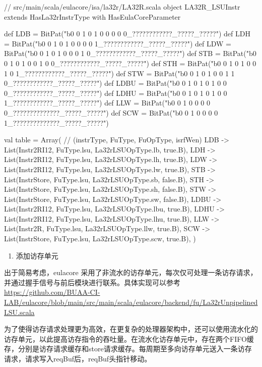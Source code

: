 \begin{CodeBlock}[language=BookScala]
// src/main/scala/eulacore/isa/la32r/LA32R.scala
object LA32R_LSUInstr extends HasLa32rInstrType with HasEulaCoreParameter {
  def LDB   = BitPat("b0 0 1 0 1 0 0 0 0 0_????????????_?????_?????")
  def LDH   = BitPat("b0 0 1 0 1 0 0 0 0 1_????????????_?????_?????")
  def LDW   = BitPat("b0 0 1 0 1 0 0 0 1 0_????????????_?????_?????")
  def STB   = BitPat("b0 0 1 0 1 0 0 1 0 0_????????????_?????_?????")
  def STH   = BitPat("b0 0 1 0 1 0 0 1 0 1_????????????_?????_?????")
  def STW   = BitPat("b0 0 1 0 1 0 0 1 1 0_????????????_?????_?????")
  def LDBU  = BitPat("b0 0 1 0 1 0 1 0 0 0_????????????_?????_?????")
  def LDHU  = BitPat("b0 0 1 0 1 0 1 0 0 1_????????????_?????_?????")
  def LLW = BitPat("b0 0 1 0 0 0 0 0_??????????????_?????_?????")
  def SCW = BitPat("b0 0 1 0 0 0 0 1_??????????????_?????_?????")

  val table = Array( // (instrType, FuType, FuOpType, isrfWen)
    LDB       -> List(Instr2RI12, FuType.lsu, La32rLSUOpType.lb, true.B),
    LDH       -> List(Instr2RI12, FuType.lsu, La32rLSUOpType.lh, true.B),
    LDW       -> List(Instr2RI12, FuType.lsu, La32rLSUOpType.lw, true.B),
    STB       -> List(InstrStore, FuType.lsu, La32rLSUOpType.sb, false.B),
    STH       -> List(InstrStore, FuType.lsu, La32rLSUOpType.sh, false.B),
    STW       -> List(InstrStore, FuType.lsu, La32rLSUOpType.sw, false.B),
    LDBU      -> List(Instr2RI12, FuType.lsu, La32rLSUOpType.lbu, true.B),
    LDHU      -> List(Instr2RI12, FuType.lsu, La32rLSUOpType.lhu, true.B),
    LLW       -> List(Instr2R, FuType.lsu, La32rLSUOpType.llw, true.B),
    SCW       -> List(InstrStore, FuType.lsu, La32rLSUOpType.scw, true.B),
  )
}
\end{CodeBlock}

\begin{enumerate}
\def\labelenumi{\arabic{enumi}.}
\setcounter{enumi}{1}
\tightlist
\item
  添加访存单元
\end{enumerate}

出于简易考虑，eulacore 采用了非流水的访存单元，每次仅可处理一条访存请求，并通过握手信号与前后模块进行联系。具体实现可以参考 \url{https://github.com/BUAA-CI-LAB/eulacore/blob/main/src/main/scala/eulacore/backend/fu/La32rUnpipelinedLSU.scala}

为了使得访存请求处理更为高效，在更复杂的处理器架构中，还可以使用流水化的访存单元，以此提高访存指令的吞吐量。在流水化访存单元中，存在两个FIFO缓存，分别是访存请求缓存和store请求缓存。每周期至多向访存单元送入一条访存请求，请求写入reqBuf后，reqBuf头指针移动。
